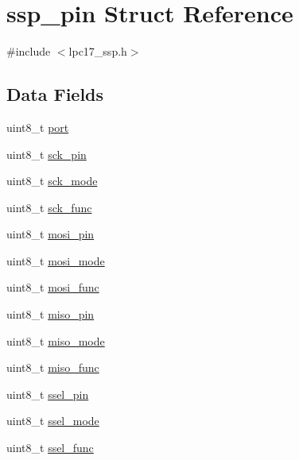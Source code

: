 \hypertarget{structssp__pin}{\section{ssp\-\_\-pin Struct Reference}
\label{structssp__pin}
}


{\ttfamily \#include $<$lpc17\-\_\-ssp.\-h$>$}

\subsection*{Data Fields}
\begin{DoxyCompactItemize}
\item 
uint8\-\_\-t \hyperlink{structssp__pin_aa55c03fea28f81652c86ba15a0e3bf7c}{port}
\item 
uint8\-\_\-t \hyperlink{structssp__pin_afb2d94476e0947349e7df1d4bb1b92c6}{sck\-\_\-pin}
\item 
uint8\-\_\-t \hyperlink{structssp__pin_a26861245cd7e60df9da672857d71a99b}{sck\-\_\-mode}
\item 
uint8\-\_\-t \hyperlink{structssp__pin_aa85fee859bda65504a8f51fd78f690af}{sck\-\_\-func}
\item 
uint8\-\_\-t \hyperlink{structssp__pin_a626fc7742d0225b88a552efda1869f90}{mosi\-\_\-pin}
\item 
uint8\-\_\-t \hyperlink{structssp__pin_ab5595f0d7da829aea2afab828dbb3085}{mosi\-\_\-mode}
\item 
uint8\-\_\-t \hyperlink{structssp__pin_a57c6694e60c2d560c64026f7bbf558df}{mosi\-\_\-func}
\item 
uint8\-\_\-t \hyperlink{structssp__pin_a4987a8729306c2bd7675c960d82f7e91}{miso\-\_\-pin}
\item 
uint8\-\_\-t \hyperlink{structssp__pin_a2d01133f8c47a6dce5fea5208de49ea1}{miso\-\_\-mode}
\item 
uint8\-\_\-t \hyperlink{structssp__pin_a166f1bb0f6e7c83bf093c5db9defd8fd}{miso\-\_\-func}
\item 
uint8\-\_\-t \hyperlink{structssp__pin_a9d565c2f896dcc50463751cd3eb4e0ac}{ssel\-\_\-pin}
\item 
uint8\-\_\-t \hyperlink{structssp__pin_a6d4a71091387fb47ef820f185adca4f9}{ssel\-\_\-mode}
\item 
uint8\-\_\-t \hyperlink{structssp__pin_a93ca137c25a2a61eb9dee6c6265d524d}{ssel\-\_\-func}
\end{DoxyCompactItemize}


